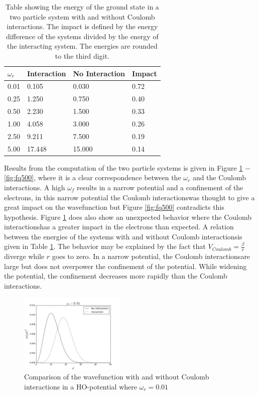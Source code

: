 \documentclass[twoside,twocolumn]{article}
\newcommand{\CI}{Coulomb interactions}
\begin{document}
	\begin{table}[p]
			\caption{Table showing the energy of the ground state in a two particle system with and without \CI. The impact is defined by the energy difference of the systems divided by the energy of the interacting system. The energies are rounded to the third digit.}\label{tbl:Coulomb}
		\begin{tabular}{|l|l|l|l|}\hline
			$\omega_r$ & Interaction & No Interaction & Impact\\ \hline
			0.01 & 0.105 & 0.030 & 0.72\\
			0.25 & 1.250  & 0.750 & 0.40\\
			0.50 & 2.230 & 1.500 &  0.33\\
			1.00 & 4.058 & 3.000 &  0.26\\
			2.50 & 9.211 & 7.500 & 0.19\\
			5.00 & 17.448 & 15.000 & 0.14\\ \hline
		\end{tabular}
	\end{table}
	Results from the computation of the two particle systems is given in Figure \ref{fig:fq001} $-$ \ref{fig:fq500}, where it is a clear correspondence between the $\omega_r$ and the \CI. A high $\omega_f$ results in a narrow potential and a confinement of the electrons, in this narrow potential the \CI was thought to give a great impact on the wavefunction but Figure \ref{fig:fq500} contradicts this hypothesis. Figure \ref{fig:fq001} does also show an unexpected behavior where the \CI has a greater impact in the electrons than expected. A relation between the energies of the systems with and without \CI is given in Table \ref{tbl:Coulomb}. The behavior may be explained by the fact that $V_{Coulomb}=\frac{\beta}{r}$ diverge while $r$ goes to zero. In a narrow potential, the \CI are large but does not overpower the confinement of the potential. While widening the potential, the confinement decreases more rapidly than the \CI.
	\begin{figure}[p]
		\includegraphics[width=0.45\textwidth]{../report/figures/freq001.png} 
		\caption{Comparison of the wavefunction with and without Coulomb interactions in a HO-potential where $\omega_r=0.01$}\label{fig:fq001}
	\end{figure}
	
\end{document}
